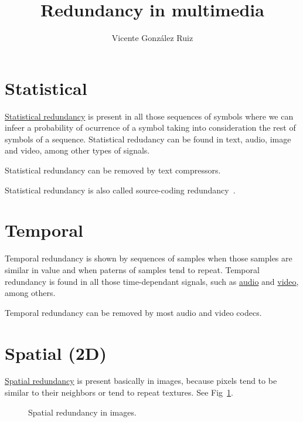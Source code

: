 
\title{Redundancy in multimedia}
\author{Vicente González Ruiz}
\maketitle

\section{Statistical}
\href{https://en.wikipedia.org/wiki/Redundancy_(information_theory)}{Statistical
  redundancy} is present in all those sequences of symbols where we
can infeer a probability of ocurrence of a symbol taking into
consideration the rest of symbols of a sequence. Statistical redudancy
can be found in text, audio, image and video, among other types of
signals.

Statistical redundancy can be removed by text compressors.

Statistical redundancy is also called source-coding redundancy~\cite{kondoz2009visual}.

\section{Temporal}
Temporal redundancy is shown by sequences of samples when those
samples are similar in value and when paterns of samples tend to
repeat. Temporal redundancy is found in all those time-dependant
signals, such as
\href{https://en.wikipedia.org/wiki/Inter_frame}{audio} and
\href{https://en.wikipedia.org/wiki/Inter_frame}{video}, among others.

Temporal redundancy can be removed by most audio and video codecs.

\section{Spatial (2D)}
\href{https://robbfoxx.wordpress.com/2015/07/12/discussion-6-2-1-what-is-redundancy-temporal-redundancy-and-spatial-redundancy/}{Spatial
  redundancy} is present basically in images, because pixels tend to
be similar to their neighbors or tend to repeat textures. See
Fig~\ref{fig:correlacion_lena}.

\begin{figure}
  \caption{Spatial redundancy in images.}
  \label{fig:correlacion_lena}
\end{figure}

%
